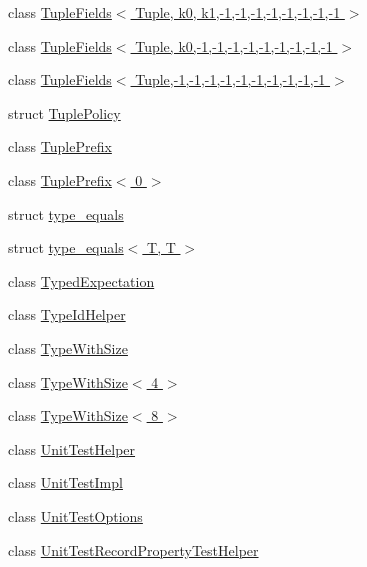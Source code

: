\begin{DoxyCompactItemize}
\item 
class \hyperlink{classtesting_1_1internal_1_1TupleFields_3_01Tuple_00_01k0_00_01k1_00-1_00-1_00-1_00-1_00-1_00-1_00-1_00-1_01_4}{Tuple\+Fields$<$ Tuple, k0, k1,-\/1,-\/1,-\/1,-\/1,-\/1,-\/1,-\/1,-\/1 $>$}
\item 
class \hyperlink{classtesting_1_1internal_1_1TupleFields_3_01Tuple_00_01k0_00-1_00-1_00-1_00-1_00-1_00-1_00-1_00-1_00-1_01_4}{Tuple\+Fields$<$ Tuple, k0,-\/1,-\/1,-\/1,-\/1,-\/1,-\/1,-\/1,-\/1,-\/1 $>$}
\item 
class \hyperlink{classtesting_1_1internal_1_1TupleFields_3_01Tuple_00-1_00-1_00-1_00-1_00-1_00-1_00-1_00-1_00-1_00-1_01_4}{Tuple\+Fields$<$ Tuple,-\/1,-\/1,-\/1,-\/1,-\/1,-\/1,-\/1,-\/1,-\/1,-\/1 $>$}
\item 
struct \hyperlink{structtesting_1_1internal_1_1TuplePolicy}{Tuple\+Policy}
\item 
class \hyperlink{classtesting_1_1internal_1_1TuplePrefix}{Tuple\+Prefix}
\item 
class \hyperlink{classtesting_1_1internal_1_1TuplePrefix_3_010_01_4}{Tuple\+Prefix$<$ 0 $>$}
\item 
struct \hyperlink{structtesting_1_1internal_1_1type__equals}{type\+\_\+equals}
\item 
struct \hyperlink{structtesting_1_1internal_1_1type__equals_3_01T_00_01T_01_4}{type\+\_\+equals$<$ T, T $>$}
\item 
class \hyperlink{classtesting_1_1internal_1_1TypedExpectation}{Typed\+Expectation}
\item 
class \hyperlink{classtesting_1_1internal_1_1TypeIdHelper}{Type\+Id\+Helper}
\item 
class \hyperlink{classtesting_1_1internal_1_1TypeWithSize}{Type\+With\+Size}
\item 
class \hyperlink{classtesting_1_1internal_1_1TypeWithSize_3_014_01_4}{Type\+With\+Size$<$ 4 $>$}
\item 
class \hyperlink{classtesting_1_1internal_1_1TypeWithSize_3_018_01_4}{Type\+With\+Size$<$ 8 $>$}
\item 
class \hyperlink{classtesting_1_1internal_1_1UnitTestHelper}{Unit\+Test\+Helper}
\item 
class \hyperlink{classtesting_1_1internal_1_1UnitTestImpl}{Unit\+Test\+Impl}
\item 
class \hyperlink{classtesting_1_1internal_1_1UnitTestOptions}{Unit\+Test\+Options}
\item 
class \hyperlink{classtesting_1_1internal_1_1UnitTestRecordPropertyTestHelper}{Unit\+Test\+Record\+Property\+Test\+Helper}

\end{DoxyCompactItemize}
